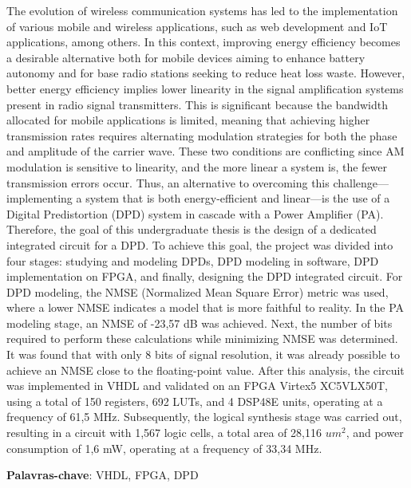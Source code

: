 The evolution of wireless communication systems has led to the implementation of various mobile and wireless applications, such as web development and IoT applications, among others. In this context, improving energy efficiency becomes a desirable alternative both for mobile devices aiming to enhance battery autonomy and for base radio stations seeking to reduce heat loss waste. However, better energy efficiency implies lower linearity in the signal amplification systems present in radio signal transmitters. This is significant because the bandwidth allocated for mobile applications is limited, meaning that achieving higher transmission rates requires alternating modulation strategies for both the phase and amplitude of the carrier wave. These two conditions are conflicting since AM modulation is sensitive to linearity, and the more linear a system is, the fewer transmission errors occur. Thus, an alternative to overcoming this challenge—implementing a system that is both energy-efficient and linear—is the use of a Digital Predistortion (DPD) system in cascade with a Power Amplifier (PA). Therefore, the goal of this undergraduate thesis is the design of a dedicated integrated circuit for a DPD. To achieve this goal, the project was divided into four stages: studying and modeling DPDs, DPD modeling in software, DPD implementation on FPGA, and finally, designing the DPD integrated circuit. For DPD modeling, the NMSE (Normalized Mean Square Error) metric was used, where a lower NMSE indicates a model that is more faithful to reality. In the PA modeling stage, an NMSE of -23,57 dB was achieved. Next, the number of bits required to perform these calculations while minimizing NMSE was determined. It was found that with only 8 bits of signal resolution, it was already possible to achieve an NMSE close to the floating-point value. After this analysis, the circuit was implemented in VHDL and validated on an FPGA Virtex5 XC5VLX50T, using a total of 150 registers, 692 LUTs, and 4 DSP48E units, operating at a frequency of 61,5 MHz. Subsequently, the logical synthesis stage was carried out, resulting in a circuit with 1,567 logic cells, a total area of 28,116 $um^2$, and power consumption of 1,6 mW, operating at a frequency of 33,34 MHz.

\textbf{Palavras-chave}: VHDL, FPGA, DPD 